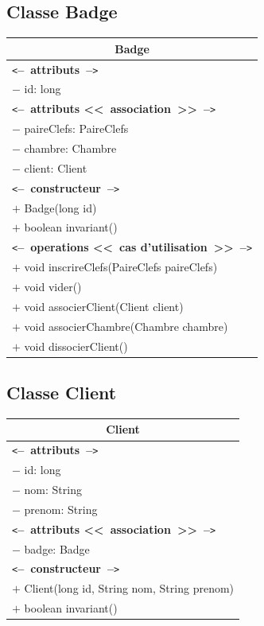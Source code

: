 \documentclass[11pt,article]{article}
\newcommand{\cmt}[1]{\texttt{<}\textbf{--~#1~--}\texttt{>}}
\begin{document}
  \subsection{Classe \textsf{Badge}}
  \begin{center}
	  \begin{longtable}{|p{15cm}|}
		  \hline
		  \multicolumn{1}{|c|}{{\Large \textsf{Badge}}} \\
		  \hline
		  \cmt{attributs}\\
		  $-$ id: long \\
		  \cmt{attributs <<~association~>>}\\
		  $-$ paireClefs: PaireClefs \\
		  $-$ chambre: Chambre \\
		  $-$ client: Client \\
		  \hline
		  \cmt{constructeur} \\
		  $+$ Badge(long id) \\
		  $+$ boolean invariant() \\
		  \cmt{operations <<~cas d'utilisation~>>} \\
		  $+$ void inscrireClefs(PaireClefs paireClefs) \\
		  $+$ void vider() \\
		  $+$ void associerClient(Client client) \\
		  $+$ void associerChambre(Chambre chambre) \\
		  $+$ void dissocierClient() \\
		  \hline
	  \end{longtable}
  \end{center}

  \subsection{Classe \textsf{Client}}
  \begin{center}
	  \begin{longtable}{|p{15cm}|}
		  \hline
		  \multicolumn{1}{|c|}{{\Large \textsf{Client}}} \\
		  \hline
		  \cmt{attributs}\\
		  $-$ id: long \\
		  $-$ nom: String \\
		  $-$ prenom: String \\
		  \cmt{attributs <<~association~>>}\\
		  $-$ badge: Badge \\
		  \hline
		  \cmt{constructeur} \\
		  $+$ Client(long id, String nom, String prenom) \\
		  $+$ boolean invariant() \\
		  \hline
	  \end{longtable}
  \end{center}
\end{document}
